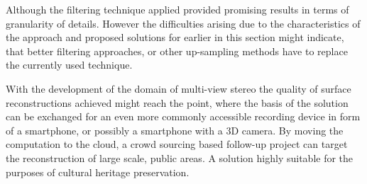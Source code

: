 \documentclass{ucl_thesis}
\begin{document}
\par Although the filtering technique applied provided promising results in terms of granularity of details. However the difficulties arising due to the characteristics of the approach and proposed solutions for earlier in this section might indicate, that better filtering approaches, or other up-sampling methods have to replace the currently used technique. \\

\par With the development of the domain of multi-view stereo the quality of surface reconstructions achieved might reach the point, where the basis of the solution can be exchanged for an even more commonly accessible recording device in form of a smartphone, or possibly a smartphone with a 3D camera. By moving the computation to the cloud, a  crowd sourcing based follow-up project can target the reconstruction of large scale, public areas. A solution highly suitable for the purposes of cultural heritage preservation.
\end{document}
